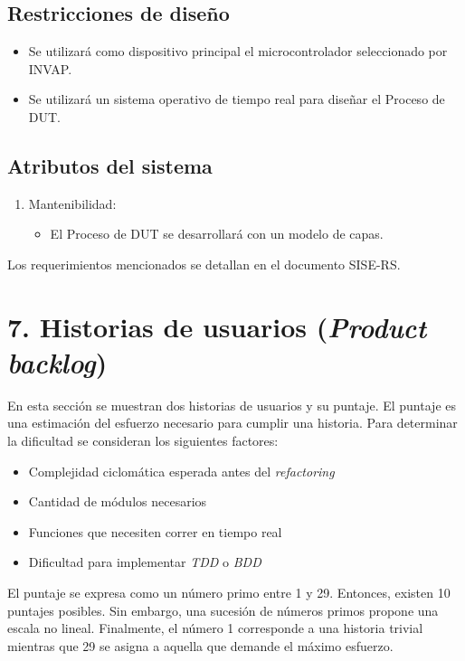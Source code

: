 \documentclass[
11pt, %
]{charter}
\begin{document}
\subsection{Restricciones de diseño}
\label{sub:restriccionesDiseño}

\begin{itemize}
	\item Se utilizará como dispositivo principal el microcontrolador seleccionado por INVAP.
	\item Se utilizará un sistema operativo de tiempo real para diseñar el Proceso de DUT.
\end{itemize}

\subsection{Atributos del sistema}
\label{sub:atributos}

\begin{enumerate}
	\item Mantenibilidad:
	\begin{itemize}
		\item El Proceso de DUT se desarrollará con un modelo de capas.
	\end{itemize}
\end{enumerate}

Los requerimientos mencionados se detallan en el documento SISE-RS.

\section{7. Historias de usuarios (\textit{Product backlog})}
\label{sec:backlog}

En esta sección se muestran dos historias de usuarios y su puntaje.
El puntaje es una estimación del esfuerzo necesario para cumplir una historia.
Para determinar la dificultad se consideran los siguientes factores:

\begin{itemize}
	\item Complejidad ciclomática esperada antes del \emph{refactoring}
	\item Cantidad de módulos necesarios
	\item Funciones que necesiten correr en tiempo real
	\item Dificultad para implementar \emph{TDD} o \emph{BDD}
\end{itemize}

El puntaje se expresa como un número primo entre 1 y 29.
Entonces, existen 10 puntajes posibles.
Sin embargo, una sucesión de números primos propone una escala no lineal.
Finalmente, el número 1 corresponde a una historia trivial mientras que 29 se asigna a aquella que demande el máximo esfuerzo.
\end{document}
